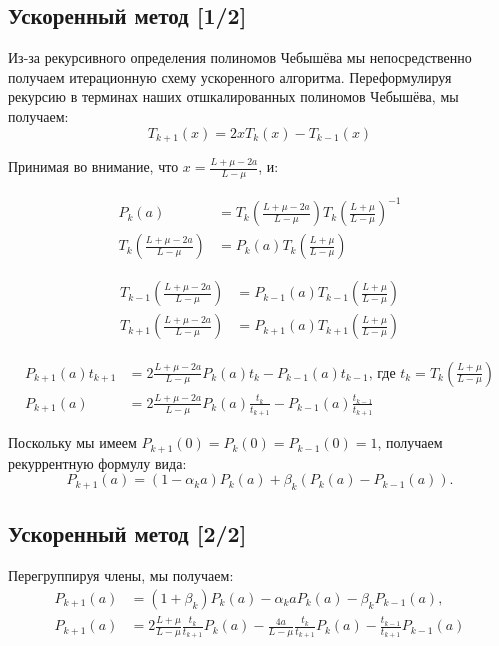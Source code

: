 \documentclass[
  russian,
  letterpaper,
  DIV=11,
  numbers=noendperiod]{scrartcl}
\begin{document}
\subsection{Ускоренный метод
{[}1/2{]}}\label{ux443ux441ux43aux43eux440ux435ux43dux43dux44bux439-ux43cux435ux442ux43eux434-12}

Из-за рекурсивного определения полиномов Чебышёва мы непосредственно
получаем итерационную схему ускоренного алгоритма. Переформулируя
рекурсию в терминах наших отшкалированных полиномов Чебышёва, мы
получаем: \[
T_{k+1}(x) =2xT_{k}(x)-T_{k-1}(x)
\]

Принимая во внимание, что \(x = \frac{L+\mu-2a}{L-\mu}\), и:

\[
\begin{aligned}
P_k(a) &= T_k\left(\frac{L+\mu-2a}{L-\mu}\right) T_k\left(\frac{L+\mu}{L-\mu}\right)^{-1}  \\
T_k\left(\frac{L+\mu-2a}{L-\mu}\right) &= P_k(a) T_k\left(\frac{L+\mu}{L-\mu}\right) 
\end{aligned}
\]

\[
\begin{aligned}
T_{k-1}\left(\frac{L+\mu-2a}{L-\mu}\right) &= P_{k-1}(a) T_{k-1}\left(\frac{L+\mu}{L-\mu}\right) \\
T_{k+1}\left(\frac{L+\mu-2a}{L-\mu}\right) &= P_{k+1}(a) T_{k+1}\left(\frac{L+\mu}{L-\mu}\right)
\end{aligned}
\]

\[
\begin{aligned}
P_{k+1}(a) t_{k+1} &= 2 \frac{L+\mu-2a}{L-\mu} P_{k}(a) t_{k} - P_{k-1}(a) t_{k-1} \text{, где } t_{k} = T_{k}\left(\frac{L+\mu}{L-\mu}\right) \\
P_{k+1}(a) &= 2 \frac{L+\mu-2a}{L-\mu} P_{k}(a) \frac{t_{k}}{t_{k+1}} - P_{k-1}(a) \frac{t_{k-1}}{t_{k+1}}
\end{aligned}
\]

Поскольку мы имеем \(P_{k+1}(0) = P_{k}(0) = P_{k-1}(0) = 1\), получаем
рекуррентную формулу вида: \[
P_{k+1}(a) = (1 - \alpha_k a) P_k(a) + \beta_k \left(P_{k}(a) - P_{k-1}(a) \right).
\]

\subsection{Ускоренный метод
{[}2/2{]}}\label{ux443ux441ux43aux43eux440ux435ux43dux43dux44bux439-ux43cux435ux442ux43eux434-22}

Перегруппируя члены, мы получаем: \[
\begin{aligned}
P_{k+1}(a) &= (1 + \beta_k) P_k(a) - \alpha_k a P_k(a) - \beta_k P_{k-1}(a), \\
P_{k+1}(a) &= 2 \frac{L+\mu}{L-\mu}  \frac{t_{k}}{t_{k+1}} P_{k}(a) - \frac{4a}{L-\mu}  \frac{t_{k}}{t_{k+1}}P_{k}(a) - \frac{t_{k-1}}{t_{k+1}} P_{k-1}(a)
\end{aligned}
\]
\end{document}
